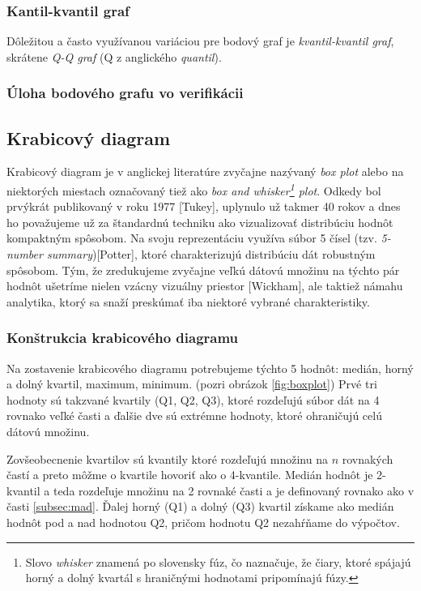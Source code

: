 \subsubsection{Kantil-kvantil graf}
Dôležitou a často využívanou variáciou pre bodový graf je \textit{kvantil-kvantil graf}, skrátene \textit{Q-Q graf} (Q z anglického \textit{quantil}).

\subsubsection{Úloha bodového grafu vo verifikácii}


\subsection{Krabicový diagram}
Krabicový diagram je v anglickej literatúre zvyčajne nazývaný \textit{box plot} alebo na niektorých miestach označovaný tiež ako \textit{box and whisker\footnote{Slovo \textit{whisker} znamená po slovensky fúz, čo naznačuje, že čiary, ktoré spájajú horný a dolný kvartál s hraničnými hodnotami pripomínajú fúzy.} plot}. Odkedy bol prvýkrát publikovaný v roku 1977 [Tukey], uplynulo už takmer 40 rokov a dnes ho považujeme už za štandardnú techniku ako vizualizovať distribúciu hodnôt kompaktným spôsobom. Na svoju reprezentáciu využíva súbor 5 čísel (tzv. \textit{5-number summary})[Potter], ktoré charakterizujú distribúciu dát robustným spôsobom. Tým, že zredukujeme zvyčajne veľkú dátovú množinu na týchto pár hodnôt ušetríme nielen vzácny vizuálny priestor [Wickham], ale taktiež námahu analytika, ktorý sa snaží preskúmať iba niektoré vybrané charakteristiky. 

\subsubsection{Konštrukcia krabicového diagramu}

Na zostavenie krabicového diagramu potrebujeme týchto 5 hodnôt: medián, horný a dolný kvartil, maximum, minimum. (pozri obrázok \ref{fig:boxplot}) Prvé tri hodnoty sú takzvané kvartily (Q1, Q2, Q3), ktoré rozdeľujú súbor dát na 4 rovnako veľké časti a ďalšie dve sú extrémne hodnoty, ktoré ohraničujú celú dátovú množinu. 

Zovšeobecnenie kvartilov sú kvantily ktoré rozdeľujú množinu na $n$ rovnakých častí a preto môžme o kvartile hovoriť ako o 4-kvantile. Medián hodnôt je 2-kvantil a teda rozdeľuje množinu na 2 rovnaké časti a je definovaný rovnako ako v časti \ref{subsec:mad}. Ďalej horný (Q1) a dolný (Q3) kvartil získame ako medián hodnôt pod a nad hodnotou Q2, pričom hodnotu Q2 nezahŕňame do výpočtov. 

